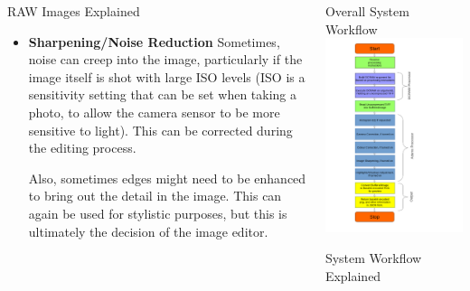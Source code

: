 \documentclass[final]{beamer}
\begin{document}
\begin{frame}{}
\begin{columns}[t]
\begin{column}{.48\linewidth}
\begin{block}{RAW Images Explained}
\begin{itemize}
          \item \textbf{Sharpening/Noise Reduction}
          Sometimes, noise can creep into the image, particularly if the image itself is shot with large ISO levels (ISO is a sensitivity setting that can be
          set when taking a photo, to allow the camera sensor to be more sensitive to light). This can be corrected
          during the editing process.
          
          Also, sometimes edges might need to be enhanced to bring out the detail in the image. This can again be used for stylistic purposes, but this is ultimately the
          decision of the image editor.
          \end{itemize}
        \end{block}
       



      \end{column}


      \begin{column}{.48\linewidth}


        \begin{block}{Overall System Workflow}
          \includegraphics[width=\columnwidth]{DesignSystemandGA}
        \end{block}
        \begin{block}{System Workflow Explained}


\end{block}
\end{column}
\end{columns}
\end{frame}
\end{document}
